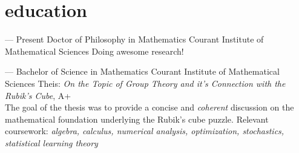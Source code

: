 \documentclass[a4paper]{simpleCV}
\begin{document}











\section{education}

\entry
{ --- Present}
{Doctor of Philosophy {\normalfont in Mathematics}}
{Courant Institute of Mathematical Sciences}
{Doing awesome research!}

\entry
{ --- }
{Bachelor of Science {\normalfont in Mathematics}}
{Courant Institute of Mathematical Sciences}
{Theis: \emph{On the Topic of Group Theory and it's Connection with the Rubik's Cube}, A+ \\
The goal of the thesis was to provide a concise and \textit{coherent} discussion on the
mathematical foundation underlying the Rubik's cube puzzle.
Relevant coursework: \emph{algebra, calculus, numerical analysis, optimization, stochastics,
statistical learning theory}}
\end{document}
